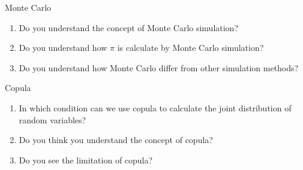 \documentclass{article}
\begin{document}
\begin{problem}
    {Monte Carlo}{}
    \begin{enumerate}
        \item Do you understand the concept of Monte Carlo simulation? \myrule{}
        \item Do you understand how $\pi$ is calculate by Monte Carlo simulation? \myrule{}
        \item Do you understand how Monte Carlo differ from other simulation methods? \\ \myrule{}
    \end{enumerate}
\end{problem}

\begin{problem}
    {Copula}{}
    \begin{enumerate}
        \item In which condition can we use copula to calculate the joint distribution of random variables? \myrule{}
        \item Do you think you understand the concept of copula? \myrule{}
        \item Do you see the limitation of copula? \myrule{}
    \end{enumerate}
\end{problem}
\end{document}
